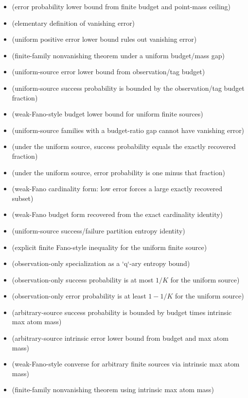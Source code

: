 \begin{itemize}
\item {} (error probability lower bound from finite budget and point-mass ceiling)
\item {} (elementary definition of vanishing error)
\item {} (uniform positive error lower bound rules out vanishing error)
\item {} (finite-family nonvanishing theorem under a uniform budget/mass gap)
\item {} (uniform-source error lower bound from observation/tag budget)
\item {} (uniform-source success probability is bounded by the observation/tag budget fraction)
\item {} (weak-Fano-style budget lower bound for uniform finite sources)
\item {} (uniform-source families with a budget-ratio gap cannot have vanishing error)
\item {} (under the uniform source, success probability equals the exactly recovered fraction)
\item {} (under the uniform source, error probability is one minus that fraction)
\item {} (weak-Fano cardinality form: low error forces a large exactly recovered subset)
\item {} (weak-Fano budget form recovered from the exact cardinality identity)
\item {} (uniform-source success/failure partition entropy identity)
\item {} (explicit finite Fano-style inequality for the uniform finite source)
\item {} (observation-only specialization as a `q`-ary entropy bound)
\item {} (observation-only success probability is at most $1/K$ for the uniform source)
\item {} (observation-only error probability is at least $1-1/K$ for the uniform source)
\item {} (arbitrary-source success probability is bounded by budget times intrinsic max atom mass)
\item {} (arbitrary-source intrinsic error lower bound from budget and max atom mass)
\item {} (weak-Fano-style converse for arbitrary finite sources via intrinsic max atom mass)
\item {} (finite-family nonvanishing theorem using intrinsic max atom mass)

\end{itemize}
